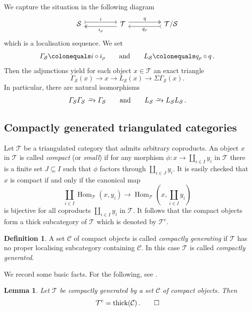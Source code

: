\documentclass{amsart}[a4]
\newtheorem{lemma}[theorem]{Lemma}
\theoremstyle{definition}
\newtheorem{definition}[theorem]{Definition}
\theoremstyle{remark}
\numberwithin{equation}{section}
\newcommand{\Hom}{\operatorname{Hom}}
\newcommand{\thick}{\operatorname{thick}}
\newcommand{\iso}{\xrightarrow{\raisebox{-.6ex}[0ex][0ex]{$\scriptstyle{\sim}$}}}
\newcommand{\lto}{\longrightarrow}
\newcommand{\cat}{\mathcal}
\newcommand{\Si}{\Sigma}
\let\Gamma\varGamma
\let\Sigma\varSigma
\begin{document}
We capture the situation in the following diagram 
\begin{equation}\label{eq:tria-loc-seq}
\begin{tikzcd}
\cat S \arrow[tail,yshift=0.75ex]{rr}{i} &&\cat T  \arrow[twoheadrightarrow,yshift=-0.75ex]{ll}{i_\rho}
\arrow[twoheadrightarrow,yshift=0.75ex]{rr}{q} &&\cat T/\cat S \arrow[tail,yshift=-0.75ex]{ll}{q_\rho}
\end{tikzcd}
\end{equation}
which is a localisation sequence. We set
\[\Gamma_\cat S\colonequals i\circ
  i_\rho\qquad\text{and}\qquad L_\cat S\colonequals q_\rho \circ
  q\,.\] Then the adjunctions yield for each object $x\in\cat T$ an
exact triangle
\begin{equation}\label{eq:loc-tria}
  \Gamma_\cat S(x)\lto x\lto L_\cat S(x)\lto\Si \Gamma_\cat S(x).
\end{equation}
In particular, there are natural isomorphisms
\[\Gamma_\cat S \Gamma_\cat S\iso \Gamma_\cat S\qquad\text{and}\qquad  L_\cat S\iso L_\cat S L_\cat S\,.\]


\subsection*{Compactly generated triangulated categories}

Let $\cat T$ be a triangulated category that admits arbitrary
coproducts. An object $x$ in $\cat T$ is called \emph{compact} (or
\emph{small}) if for any morphism
$\phi\colon x\to \coprod_{i\in I}y_i$ in $\cat T$ there is a finite
set $J\subseteq I$ such that $\phi$ factors through
$\coprod_{i\in J}y_i$. It is easily checked that $x$ is compact if and
only if the canonical map
\[ \coprod_{i\in I}\Hom_{\cat T}(x,y_i)\lto \Hom_{\cat T}(x,\coprod_{i\in I}y_i)\]
is bijective for all coproducts $\coprod_{i\in I}y_i$ in $\cat T$. It
follows that the compact objects form a thick subcategory of $\cat T$
which is denoted by $\cat T^{\mathrm c}$.

\begin{definition}
  A set $\cat C$ of compact objects is called \emph{compactly
  generating} if $\cat T$ has no proper localising subcategory
containing $\cat C$. In this case $\cat T$ is called \emph{compactly
  generated}.
\end{definition}

We record some basic facts. For the following, see
\cite[Proposition~3.4.15]{Krause:2022a}.

\begin{lemma}\label{le:comp-gen}\pushQED{\qed} 
  Let $\cat T$ be compactly generated by a set $\cat C$ of compact
  objects. Then
\[\cat T^{\mathrm c}=\thick(\cat C)\,.\qedhere\]
\end{lemma}
\end{document}

